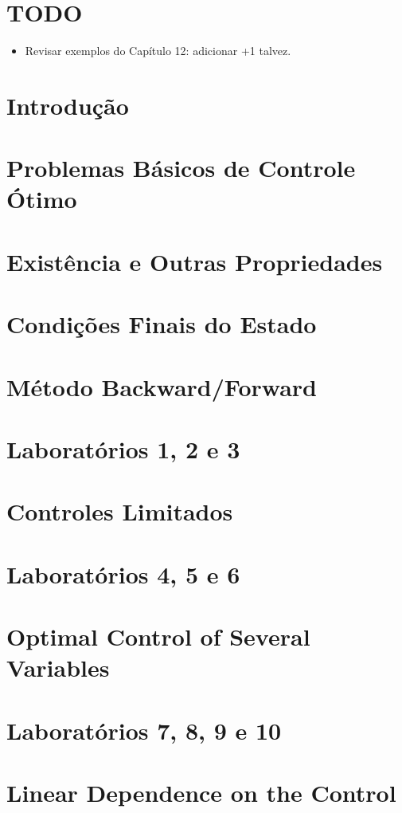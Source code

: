 \documentclass[a4paper, 11pt, oneside]{book}
\theoremstyle{definition}
\begin{document}


\tableofcontents

\chapter{TODO}

\begin{itemize}
    \item Revisar exemplos do Capítulo 12: adicionar +1 talvez. 
\end{itemize}

\chapter{Introdução}
\label{ch:intro}


\chapter{Problemas Básicos de Controle Ótimo}
\label{ch:1}


\chapter{Existência e Outras Propriedades}
\label{ch:2}


\chapter{Condições Finais do Estado}
\label{ch:3}


\chapter{Método Backward/Forward}
\label{ch:4}


\chapter{Laboratórios 1, 2 e 3}
\label{labs123}


\chapter{Controles Limitados}
\label{ch:8}


\chapter{Laboratórios 4, 5 e 6}
\label{labs456}


\chapter{Optimal Control of Several Variables}
\label{ch:12}


\chapter{Laboratórios 7, 8, 9 e 10}
\label{labs78910}


\chapter{Linear Dependence on the Control}
\label{ch:17}



\end{document}
